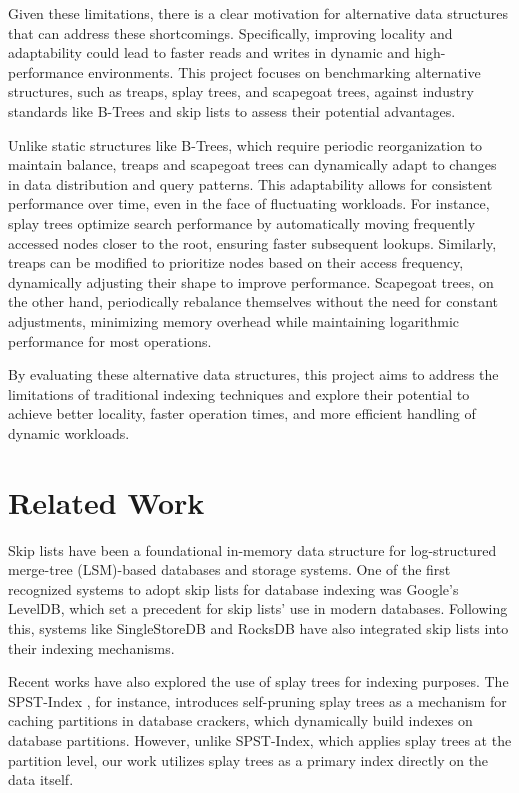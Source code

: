 \documentclass[sigconf]{acmart}
\begin{document}
Given these limitations, there is a clear motivation for alternative data structures that can address these shortcomings. Specifically, improving locality and adaptability could lead to faster reads and writes in dynamic and high-performance environments. This project focuses on benchmarking alternative structures, such as treaps, splay trees, and scapegoat trees, against industry standards like B-Trees and skip lists to assess their potential advantages.

Unlike static structures like B-Trees, which require periodic reorganization to maintain balance, treaps and scapegoat trees can dynamically adapt to changes in data distribution and query patterns. This adaptability allows for consistent performance over time, even in the face of fluctuating workloads. For instance, splay trees optimize search performance by automatically moving frequently accessed nodes closer to the root, ensuring faster subsequent lookups. Similarly, treaps can be modified to prioritize nodes based on their access frequency, dynamically adjusting their shape to improve performance. Scapegoat trees, on the other hand, periodically rebalance themselves without the need for constant adjustments, minimizing memory overhead while maintaining logarithmic performance for most operations.

By evaluating these alternative data structures, this project aims to address the limitations of traditional indexing techniques and explore their potential to achieve better locality, faster operation times, and more efficient handling of dynamic workloads.

\section{Related Work}
Skip lists have been a foundational in-memory data structure for log-structured merge-tree (LSM)-based databases and storage systems. One of the first recognized systems to adopt skip lists for database indexing was Google's LevelDB, which set a precedent for skip lists' use in modern databases. Following this, systems like SingleStoreDB \cite{prout_2019_the} and RocksDB have also integrated skip lists into their indexing mechanisms.

Recent works have also explored the use of splay trees for indexing purposes. The SPST-Index \cite{spst_index}, for instance, introduces self-pruning splay trees as a mechanism for caching partitions in database crackers, which dynamically build indexes on database partitions. However, unlike SPST-Index, which applies splay trees at the partition level, our work utilizes splay trees as a primary index directly on the data itself.
\end{document}
